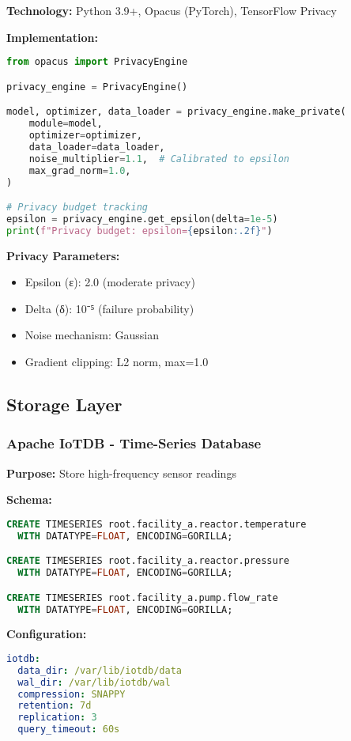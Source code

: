 \documentclass[12pt,a4paper]{article}
\begin{document}
\textbf{Technology:} Python 3.9+, Opacus (PyTorch), TensorFlow Privacy

\textbf{Implementation:}
\begin{lstlisting}[language=python]
from opacus import PrivacyEngine

privacy_engine = PrivacyEngine()

model, optimizer, data_loader = privacy_engine.make_private(
    module=model,
    optimizer=optimizer,
    data_loader=data_loader,
    noise_multiplier=1.1,  # Calibrated to epsilon
    max_grad_norm=1.0,
)

# Privacy budget tracking
epsilon = privacy_engine.get_epsilon(delta=1e-5)
print(f"Privacy budget: epsilon={epsilon:.2f}")
\end{lstlisting}

\textbf{Privacy Parameters:}
\begin{itemize}[leftmargin=1cm,itemsep=0pt]
    \item Epsilon (ε): 2.0 (moderate privacy)
    \item Delta (δ): 10⁻⁵ (failure probability)
    \item Noise mechanism: Gaussian
    \item Gradient clipping: L2 norm, max=1.0
\end{itemize}

\subsection{Storage Layer}

\subsubsection{Apache IoTDB - Time-Series Database}

\textbf{Purpose:} Store high-frequency sensor readings

\textbf{Schema:}
\begin{lstlisting}[language=sql]
CREATE TIMESERIES root.facility_a.reactor.temperature 
  WITH DATATYPE=FLOAT, ENCODING=GORILLA;

CREATE TIMESERIES root.facility_a.reactor.pressure 
  WITH DATATYPE=FLOAT, ENCODING=GORILLA;

CREATE TIMESERIES root.facility_a.pump.flow_rate 
  WITH DATATYPE=FLOAT, ENCODING=GORILLA;
\end{lstlisting}

\textbf{Configuration:}
\begin{lstlisting}[language=yaml]
iotdb:
  data_dir: /var/lib/iotdb/data
  wal_dir: /var/lib/iotdb/wal
  compression: SNAPPY
  retention: 7d
  replication: 3
  query_timeout: 60s
\end{lstlisting}
\end{document}
